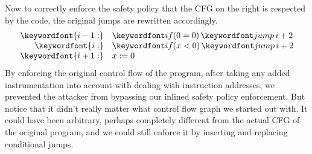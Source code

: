 \documentclass[11pt,twoside]{scrartcl}
\begin{document}
Now to correctly enforce the safety policy that the CFG on the right is respected by the code, the original jumps are rewritten accordingly.
\[
\begin{array}{rl}
\keywordfont{i-1:} & \pifjump{0=0}{i+2} \\
\keywordfont{i:} & \pifjump{x < 0}{i+2} \\
\keywordfont{i+1:} & x := 0
\end{array}
\]
By enforcing the original control flow of the program, after taking any added instrumentation into account with dealing with instruction addresses, we prevented the attacker from bypassing our inlined safety policy enforcement. But notice that it didn't really matter what control flow graph we started out with. It could have been arbitrary, perhaps completely different from the actual CFG of the original program, and we could still enforce it by inserting and replacing conditional jumps.

% 

\end{document}
